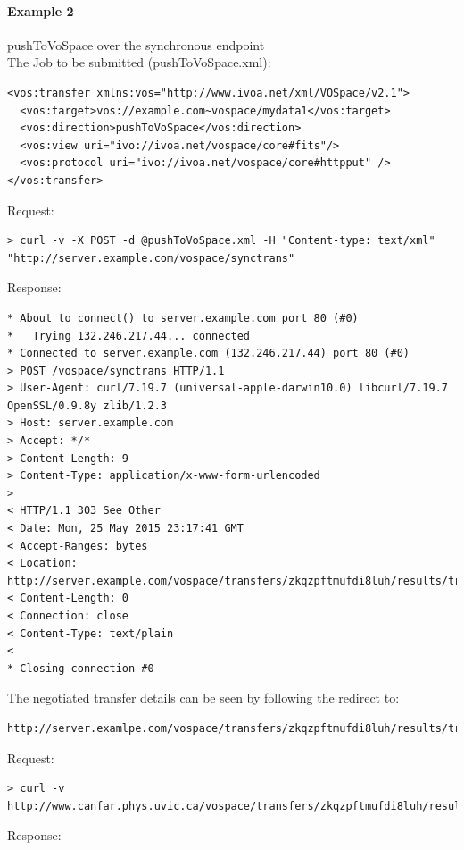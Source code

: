 \documentclass[11pt,a4paper]{ivoa}
\begin{document}
\paragraph{Example 2}
pushToVoSpace over the synchronous endpoint
\\[5px]
\noindent
The Job to be submitted (pushToVoSpace.xml):
\begin{lstlisting}
<vos:transfer xmlns:vos="http://www.ivoa.net/xml/VOSpace/v2.1">
  <vos:target>vos://example.com~vospace/mydata1</vos:target>
  <vos:direction>pushToVoSpace</vos:direction>
  <vos:view uri="ivo://ivoa.net/vospace/core#fits"/>
  <vos:protocol uri="ivo://ivoa.net/vospace/core#httpput" />
</vos:transfer>
\end{lstlisting}
Request:
\begin{lstlisting}
> curl -v -X POST -d @pushToVoSpace.xml -H "Content-type: text/xml" "http://server.example.com/vospace/synctrans"
\end{lstlisting}
Response:
\begin{lstlisting}
* About to connect() to server.example.com port 80 (#0)
*   Trying 132.246.217.44... connected
* Connected to server.example.com (132.246.217.44) port 80 (#0)
> POST /vospace/synctrans HTTP/1.1
> User-Agent: curl/7.19.7 (universal-apple-darwin10.0) libcurl/7.19.7 OpenSSL/0.9.8y zlib/1.2.3
> Host: server.example.com
> Accept: */*
> Content-Length: 9
> Content-Type: application/x-www-form-urlencoded
>
< HTTP/1.1 303 See Other
< Date: Mon, 25 May 2015 23:17:41 GMT
< Accept-Ranges: bytes
< Location: http://server.example.com/vospace/transfers/zkqzpftmufdi8luh/results/transferDetails
< Content-Length: 0
< Connection: close
< Content-Type: text/plain
<
* Closing connection #0
\end{lstlisting}
The negotiated transfer details can be seen by following the redirect to:
\begin{lstlisting}
http://server.examlpe.com/vospace/transfers/zkqzpftmufdi8luh/results/transferDetails
\end{lstlisting}
Request:
\begin{lstlisting}
> curl -v http://www.canfar.phys.uvic.ca/vospace/transfers/zkqzpftmufdi8luh/results/transferDetails
\end{lstlisting}
Response:
\end{document}
